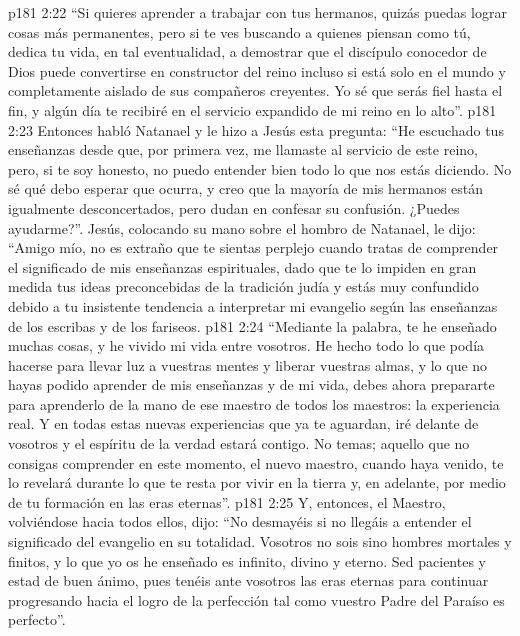 \vs p181 2:22 “Si quieres aprender a trabajar con tus hermanos, quizás puedas lograr cosas más permanentes, pero si te ves buscando a quienes piensan como tú, dedica tu vida, en tal eventualidad, a demostrar que el discípulo conocedor de Dios puede convertirse en constructor del reino incluso si está solo en el mundo y completamente aislado de sus compañeros creyentes. Yo sé que serás fiel hasta el fin, y algún día te recibiré en el servicio expandido de mi reino en lo alto”.
\vs p181 2:23 Entonces habló Natanael y le hizo a Jesús esta pregunta: “He escuchado tus enseñanzas desde que, por primera vez, me llamaste al servicio de este reino, pero, si te soy honesto, no puedo entender bien todo lo que nos estás diciendo. No sé qué debo esperar que ocurra, y creo que la mayoría de mis hermanos están igualmente desconcertados, pero dudan en confesar su confusión. ¿Puedes ayudarme?”. Jesús, colocando su mano sobre el hombro de Natanael, le dijo: “Amigo mío, no es extraño que te sientas perplejo cuando tratas de comprender el significado de mis enseñanzas espirituales, dado que te lo impiden en gran medida tus ideas preconcebidas de la tradición judía y estás muy confundido debido a tu insistente tendencia a interpretar mi evangelio según las enseñanzas de los escribas y de los fariseos.
\vs p181 2:24 “Mediante la palabra, te he enseñado muchas cosas, y he vivido mi vida entre vosotros. He hecho todo lo que podía hacerse para llevar luz a vuestras mentes y liberar vuestras almas, y lo que no hayas podido aprender de mis enseñanzas y de mi vida, debes ahora prepararte para aprenderlo de la mano de ese maestro de todos los maestros: la experiencia real. Y en todas estas nuevas experiencias que ya te aguardan, iré delante de vosotros y el espíritu de la verdad estará contigo. No temas; aquello que no consigas comprender en este momento, el nuevo maestro, cuando haya venido, te lo revelará durante lo que te resta por vivir en la tierra y, en adelante, por medio de tu formación en las eras eternas”.
\vs p181 2:25 Y, entonces, el Maestro, volviéndose hacia todos ellos, dijo: “No desmayéis si no llegáis a entender el significado del evangelio en su totalidad. Vosotros no sois sino hombres mortales y finitos, y lo que yo os he enseñado es infinito, divino y eterno. Sed pacientes y estad de buen ánimo, pues tenéis ante vosotros las eras eternas para continuar progresando hacia el logro de la perfección tal como vuestro Padre del Paraíso es perfecto”.
